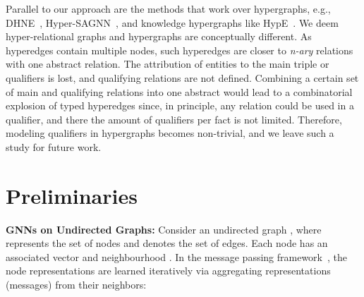 \documentclass[11pt,a4paper]{article}
\begin{document}
Parallel to our approach are the methods that work over hypergraphs, e.g., DHNE~\citep{tu2018structural}, Hyper-SAGNN~\citep{Zhang2020Hyper-SAGNN}, and knowledge hypergraphs like HypE~\citep{ijcai2020-303}. 
We deem hyper-relational graphs and hypergraphs are conceptually different. 
As hyperedges contain multiple nodes, such hyperedges are closer to \emph{n-ary} relations \emph{} with one abstract relation. 
The attribution of entities to the main triple or qualifiers is lost, and qualifying relations are not defined. 
Combining a certain set of main and qualifying relations into one abstract  would lead to a combinatorial explosion of typed hyperedges since, in principle, any relation could be used in a qualifier, and there the amount of qualifiers per fact is not limited.
Therefore, modeling qualifiers in hypergraphs becomes non-trivial, and we leave such a study for future work.





















































\section{Preliminaries}
\label{sec:prelims}




\textbf{GNNs on Undirected Graphs:} Consider an undirected graph , where  represents the set of nodes  and  denotes the set of edges. 
Each node  has an associated vector  and neighbourhood . 
In the message passing framework~\citep{DBLP:conf/icml/GilmerSRVD17}, the node representations are learned iteratively via aggregating representations (messages) from their neighbors:
\end{document}
